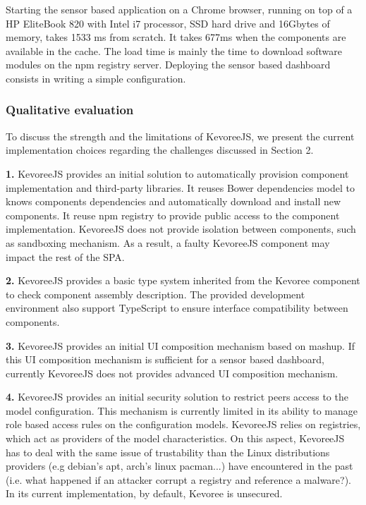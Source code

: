 Starting the sensor based application on a Chrome browser, running on top of a HP EliteBook 820 with Intel i7 processor, SSD hard drive and 16Gbytes of memory, takes 1533 ms from scratch. It takes 677ms when the components are available in the cache. The load time is mainly the time to download software modules on the npm registry server. Deploying the sensor based dashboard consists in writing a simple configuration.    


\subsubsection{Qualitative evaluation  }
To discuss the strength and the limitations of KevoreeJS, we present the current implementation choices regarding the challenges discussed in Section 2.   

\indent \textbf{1.} KevoreeJS provides an initial solution to automatically provision component implementation and third-party libraries. It reuses Bower dependencies model to knows components dependencies and automatically download and install new components. It reuse npm registry to provide public access to the component implementation. KevoreeJS does not provide isolation between components, such as sandboxing mechanism. As a result, a faulty KevoreeJS component may impact the rest of the SPA. 

\indent \textbf{2.} KevoreeJS provides a basic type system inherited from the Kevoree component to check component assembly description. The provided development environment also support TypeScript to ensure interface compatibility between components.  

\indent \textbf{3.} KevoreeJS provides an initial UI composition mechanism based on mashup. If this UI composition mechanism is sufficient for a sensor based dashboard, currently KevoreeJS does not provides advanced UI composition mechanism.  

\indent \textbf{4.} KevoreeJS provides an initial security solution to restrict peers access to the model configuration. This mechanism is currently limited in its ability to manage  role based access rules on the configuration models. KevoreeJS relies on registries, which act as providers of the model characteristics. On this aspect, KevoreeJS has to deal with the same issue of trustability than the Linux distributions providers (e.g debian's apt, arch's linux pacman...) have encountered in the past (i.e. what happened if an attacker corrupt a registry and reference a malware?).  In its current implementation, by default, Kevoree is unsecured.   

